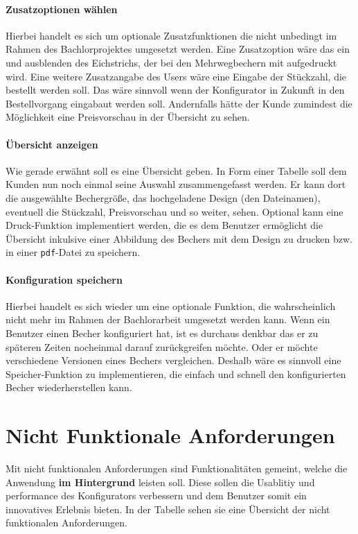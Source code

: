 \paragraph{Zusatzoptionen wählen}
Hierbei handelt es sich um optionale Zusatzfunktionen die nicht unbedingt im Rahmen des Bachlorprojektes umgesetzt werden. Eine Zusatzoption wäre das ein und ausblenden des Eichstrichs, der bei den Mehrwegbechern mit aufgedruckt wird. Eine weitere Zusatzangabe des Users wäre eine Eingabe der Stückzahl, die bestellt werden soll. Das wäre sinnvoll wenn der Konfigurator in Zukunft in den Bestellvorgang eingabaut werden soll. Andernfalls hätte der Kunde zumindest die Möglichkeit eine Preisvorschau in der Übersicht zu sehen.
%
\paragraph{Übersicht anzeigen}
Wie gerade erwähnt soll es eine Übersicht geben. In Form einer Tabelle soll dem Kunden nun noch einmal seine Auswahl zusammengefasst werden. Er kann dort die ausgewählte Bechergröße, das hochgeladene Design (den Dateinamen), eventuell die Stückzahl, Preisvorschau und so weiter, sehen. Optional kann eine Druck-Funktion implementiert werden, die es dem Benutzer ermöglicht die Übersicht inkulsive einer Abbildung des Bechers mit dem Design zu drucken bzw. in einer \texttt{pdf}-Datei zu speichern.
%
\paragraph{Konfiguration speichern}
Hierbei handelt es sich wieder um eine optionale Funktion, die wahrscheinlich nicht mehr im Rahmen der Bachlorarbeit umgesetzt werden kann. Wenn ein Benutzer einen Becher konfiguriert hat, ist es durchaus denkbar das er zu späteren Zeiten nocheinmal darauf zurückgreifen möchte. Oder er möchte verschiedene Versionen eines Bechers vergleichen. Deshalb wäre es sinnvoll eine Speicher-Funktion zu implementieren, die einfach und schnell den konfigurierten Becher wiederherstellen kann.
%
%
%
%
\section{Nicht Funktionale Anforderungen}
\label{sec:problemanalyse}
%
Mit nicht funktionalen Anforderungen sind Funktionalitäten gemeint, welche die Anwendung \textbf{im Hintergrund} leisten soll. Diese sollen die Usablitiy und performance des Konfigurators verbessern und dem Benutzer somit ein innovatives Erlebnis bieten. In der Tabelle sehen sie eine Übersicht der nicht funktionalen Anforderungen.

